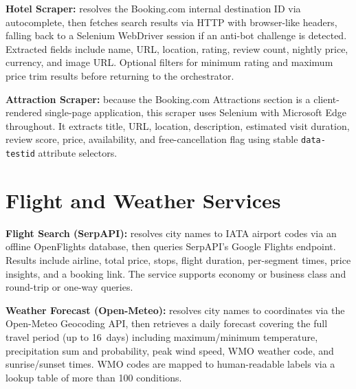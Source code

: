 \documentclass[12pt,a4paper]{report}
\begin{document}
\textbf{Hotel Scraper:} resolves the Booking.com internal destination ID via autocomplete, then
fetches search results via HTTP with browser-like headers, falling back to a Selenium WebDriver
session if an anti-bot challenge is detected. Extracted fields include name, URL, location,
rating, review count, nightly price, currency, and image URL. Optional filters for minimum rating
and maximum price trim results before returning to the orchestrator.

\textbf{Attraction Scraper:} because the Booking.com Attractions section is a client-rendered
single-page application, this scraper uses Selenium with Microsoft Edge throughout. It extracts
title, URL, location, description, estimated visit duration, review score, price, availability,
and free-cancellation flag using stable \texttt{data-testid} attribute selectors.

\section{Flight and Weather Services}

\textbf{Flight Search (SerpAPI):} resolves city names to IATA airport codes via an offline
OpenFlights database, then queries SerpAPI's Google Flights endpoint. Results include airline,
total price, stops, flight duration, per-segment times, price insights, and a booking link.
The service supports economy or business class and round-trip or one-way queries.

\textbf{Weather Forecast (Open-Meteo):} resolves city names to coordinates via the Open-Meteo
Geocoding API, then retrieves a daily forecast covering the full travel period (up to 16~days)
including maximum/minimum temperature, precipitation sum and probability, peak wind speed, WMO
weather code, and sunrise/sunset times. WMO codes are mapped to human-readable labels via a lookup
table of more than 100 conditions.

\end{document}

